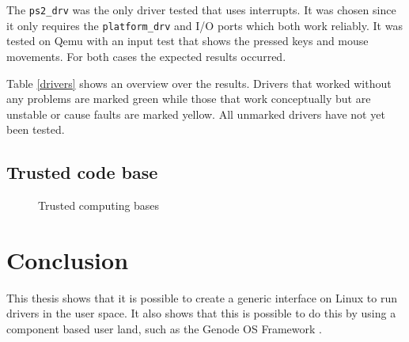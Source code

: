 \documentclass[
a4paper,
12pt,
notitlepage,
parskip=half,
DIV=11,
]{scrbook}
\begin{document}
		The \texttt{ps2\_drv} was the only driver tested that uses interrupts.
		It was chosen since it only requires the \texttt{platform\_drv} and I/O ports which both work reliably.
		It was tested on Qemu with an input test that shows the pressed keys and mouse movements.
		For both cases the expected results occurred.
		
		Table \ref{drivers} shows an overview over the results.
		Drivers that worked without any problems are marked green while those that work conceptually but are unstable or cause faults are marked yellow.
		All unmarked drivers have not yet been tested.
		
		\section{Trusted code base}
		
		\begin{figure}
			\centering
			\caption{Trusted computing bases}
			\label{fig:tcb}
		\end{figure}
	
	\chapter{Conclusion}
	
		This thesis shows that it is possible to create a generic interface on Linux to run drivers in the user space.
		It also shows that this is possible to do this by using a component based user land, such as the Genode OS Framework \citep{genode}.
		
\end{document}
